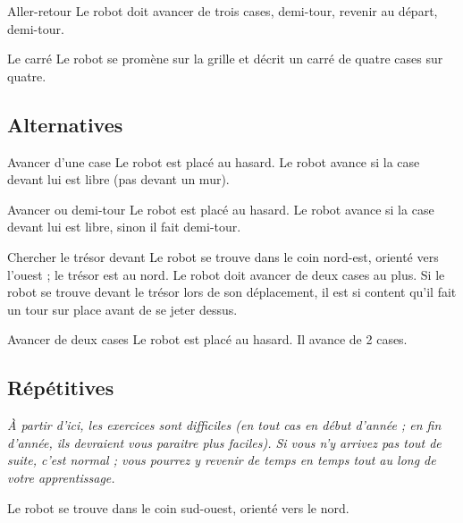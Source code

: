 \begin{Exercice}{Aller-retour}
	Le robot doit avancer de trois cases, demi-tour, 
	revenir au départ, demi-tour.
\end{Exercice}

\begin{Exercice}{Le carré}
	Le robot se promène sur la grille 
	et décrit un carré de quatre cases sur quatre.
\end{Exercice}
		
	\subsection{Alternatives}

\begin{Exercice}{Avancer d’une case}
	Le robot est placé au hasard.
	Le robot avance si la case devant lui est libre (pas devant un mur).
\end{Exercice}

\begin{Exercice}{Avancer ou demi-tour}
	Le robot est placé au hasard. 
	Le robot avance si la case devant lui est libre,
	sinon il fait demi-tour.
\end{Exercice}

\begin{Exercice}{Chercher le trésor devant}
	Le robot se trouve dans le coin nord-est, orienté vers
	l’ouest ; le trésor est au nord. Le robot doit avancer
	de deux cases au plus. Si le robot se trouve devant le trésor lors de
	son déplacement, il est si content qu’il fait un tour
	sur place avant de se jeter dessus.
\end{Exercice}

\begin{Exercice}{Avancer de deux cases}
	Le robot est placé au hasard. Il avance de 2 cases.
\end{Exercice}


	\subsection{Répétitives}

		\emph{%
		À partir d’ici, les exercices sont difficiles
		(en tout cas en début d’année ; en fin d’année,
		ils devraient vous paraitre plus faciles).
		Si vous n’y arrivez pas tout de suite, c’est normal ; 
		vous pourrez y revenir de temps en temps 
		tout au long de votre apprentissage.
		}

		Le robot se trouve dans le coin sud-ouest, orienté vers le nord.

